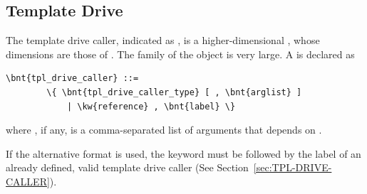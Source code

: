\subsection{Template Drive}\label{sec:TplDriveCaller}
The template drive caller,
indicated as , is a higher-dimensional ,
whose dimensions are those of .
The family of the  object is very large.
A  is declared as
\begin{Verbatim}[commandchars=\\\{\}]
    \bnt{tpl_drive_caller} ::=
        \{ \bnt{tpl_drive_caller_type} [ , \bnt{arglist} ]
            | \kw{reference} , \bnt{label} \}
\end{Verbatim}    
where , if any, is a comma-separated list of arguments
that depends on .

If the alternative format is used, the keyword  
must be followed by the label of an already defined, valid template drive caller
(See Section~\ref{sec:TPL-DRIVE-CALLER}).

